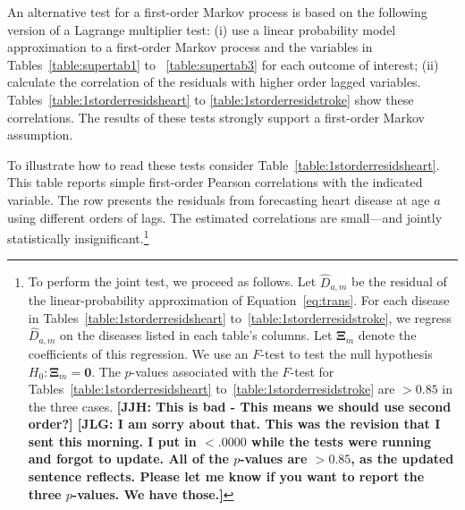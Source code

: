 \noindent An alternative test for a first-order Markov process is based on the following version of a Lagrange multiplier test: (i) use a linear probability model approximation to a first-order Markov process and the variables in Tables~\ref{table:supertab1} to ~\ref{table:supertab3} for each outcome of interest; (ii) calculate the correlation of the residuals with higher order lagged variables. Tables~\ref{table:1storderresidsheart} to \ref{table:1storderresidstroke} show these correlations. The results of these tests strongly support a first-order Markov assumption.

\noindent To illustrate how to read these tests consider Table~\ref{table:1storderresidsheart}. This table reports simple first-order Pearson correlations with the indicated variable. The row presents the residuals from forecasting heart disease at age $a$ using different orders of lags. The estimated correlations are small---and jointly statistically insignificant.\footnote{To perform the joint test, we proceed as follows. Let $\hat{D}_{a,m}$ be the residual of the linear-probability approximation of Equation~\eqref{eq:trans}. For each disease in Tables~\ref{table:1storderresidsheart} to~\ref{table:1storderresidstroke}, we regress $\hat{D}_{a,m}$ on the diseases listed in each table's columns. Let $\bm{\Xi}_m$ denote the coefficients of this regression. We use an $F$-test to test the null hypothesis $H_0: \bm{\Xi}_m = \bm{0}$. The $p$-values associated with  the $F$-test for Tables~\ref{table:1storderresidsheart} to~\ref{table:1storderresidstroke} are $>0.85$ in the three cases. \textbf{[JJH: This is bad - This means we should use second order?] [JLG: I am sorry about that. This was the revision that I sent this morning. I put in $<.0000$ while the tests were running and forgot to update. All of the $p$-values are $>0.85$, as the updated sentence reflects. Please let me know if you want to report the three $p$-values. We have those.]}}

